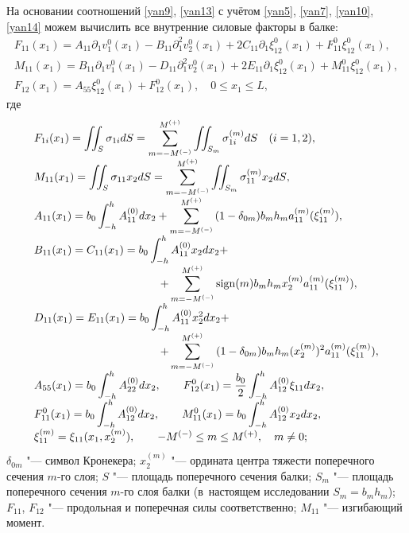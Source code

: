 На основании соотношений \eqref{yan9}, \eqref{yan13} с учётом \eqref{yan5}, \eqref{yan7}, \eqref{yan10}, \eqref{yan14} можем вычислить все внутренние силовые факторы в балке:
\begin{equation}
\label{yan15}
\begin{array}{l}
F_{11}(x_1)=A_{11}\partial_1v_1^0(x_1)-B_{11}\partial_1^2v_2^0(x_1)+2C_{11}\partial_1\xi_{12}^0(x_1)+F_{11}^0\xi_{12}^0(x_1), 
\\[2mm] 
M_{11}(x_1)=B_{11}\partial_1v_1^0(x_1)-D_{11}\partial_1^2v_2^0(x_1)+2E_{11}\partial_1\xi_{12}^0(x_1)+M_{11}^0\xi_{12}^0(x_1), 
\\[2mm]
F_{12}(x_1)=A_{55}\xi_{12}^0(x_1)+F_{12}^0(x_1),\quad 0\le x_1\le L, 
\end{array}
\end{equation}
где
\begin{equation}
\label{yan16}
\begin{array}{l}
\displaystyle 
F_{1i}(x_1)=\iint_S{\sigma_{1i}dS}=\sum\limits_{m=-M^{(-)}}^{M^{(+)}}{\iint_{S_m }{\sigma_{1i}^{(m)}dS}}\quad (i=1, 2), 
\\[2mm] 
\displaystyle 
M_{11}(x_1)=\iint_S{\sigma_{11}x_2dS}=\sum\limits_{m=-M^{(-)}}^{M^{(+)}}{\iint_{S_m}{\sigma_{11}^{(m)}x_2dS}}, 
\\[2mm] 
\displaystyle 
A_{11}(x_1)=b_0\int_{-h}^h{A_{11}^{(0)}dx_2}+\sum\limits_{m=-M^{(-)}}^{M^{(+)}}{(1-\delta_{0m})b_m h_m a_{11}^{(m)}(\xi_{11}^{(m)})}, 
\\[2mm] 
\displaystyle 
B_{11}(x_1)=C_{11}(x_1)=b_0\int_{-h}^h{A_{11}^{(0)}x_2dx_2}+
\\[2mm] 
\displaystyle \hspace{4cm}
 +\sum\limits_{m=-M^{(-)}}^{M^{(+)}}{{\rm sign}(m)b_m h_m x_2^{(m)}a_{11}^{(m)}(\xi_{11}^{(m)})}, 
\\[2mm] 
\displaystyle 
D_{11}(x_1)=E_{11}(x_1)=b_0\int_{-h}^h{A_{11}^{(0)}x_2^2dx_2}+
\\[2mm] 
\displaystyle \hspace{4cm}
+\sum\limits_{m=-M^{(-)}}^{M^{(+)}}{(1-\delta_{0m})}b_m h_m(x_2^{(m)})^2a_{11}^{(m)}(\xi_{11}^{(m)}), 
\\[2mm] 
\displaystyle  A_{55}(x_1)=b_0\int_{-h}^h{A_{22}^{(0)}dx_2},\qquad F_{12}^0(x_1)=\frac{b_0}{2}\int_{-h}^h{A_{12}^{(0)}\xi_{11}dx_2},
\\[2mm] 
\displaystyle 
F_{11}^0(x_1)=b_0\int_{-h}^h{A_{12}^{(0)}dx_2}, 
\qquad 
M_{11}^0(x_1)=b_0\int_{-h}^h{A_{12}^{(0)}x_2dx_2},\\[2mm]
\xi_{11}^{(m)}=\xi_{11}(x_1,x_2^{(m)}),\qquad -M^{(-)}\le m\le M^{(+)},\quad m\ne0; 
\end{array}
\end{equation}
$\delta_{0m}$ "--- символ Кронекера; 
$x_2^{(m)}$ "--- ордината центра тяжести поперечного сечения $m$-го слоя; 
$S$ "--- площадь поперечного сечения балки; 
$S_m$ "--- площадь поперечного сечения $m$-го слоя балки (в~настоящем исследовании $S_m=b_m h_m$); $F_{11}$, $F_{12}$ "--- продольная и поперечная силы соответственно; 
$M_{11}$ "--- изгибающий момент.

